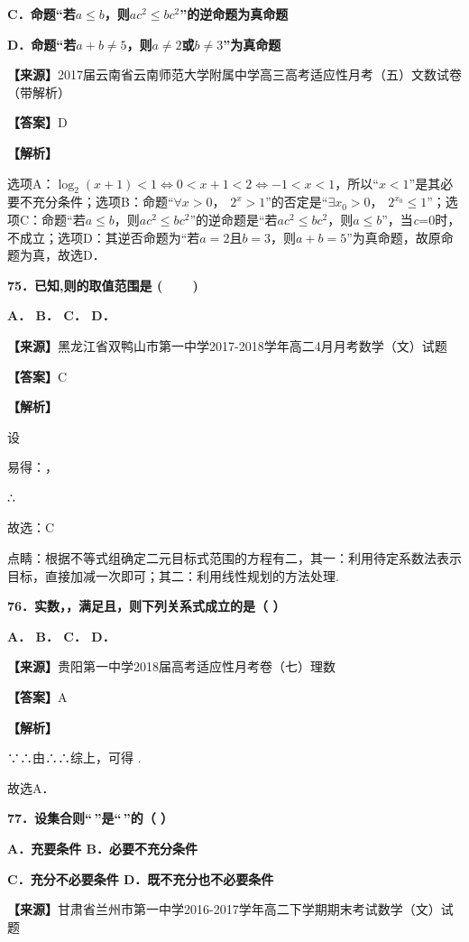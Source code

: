 \documentclass[
]{article}
\begin{document}
\textbf{C．命题``若}\(a \leq b\)\textbf{，则}\(ac^{2} \leq bc^{2}\)\textbf{''的逆命题为真命题}

\textbf{D．命题``若}\(a + b \neq 5\)\textbf{，则}\(a \neq 2\)\textbf{或}\(b \neq 3\)\textbf{''为真命题}

\textbf{【来源】}2017届云南省云南师范大学附属中学高三高考适应性月考（五）文数试卷（带解析）

\textbf{【答案】}D

\textbf{【解析】}

选项A：\(\log_{2}(x + 1) < 1 \Leftrightarrow 0 < x + 1 < 2 \Leftrightarrow - 1 < x < 1\)，所以``\(x < 1\)''是其必要不充分条件；选项B：命题``\(\forall x > 0，\text{  }2^{x} > 1\)''的否定是``\(\exists x_{0} > 0，\text{  }2^{x_{0}} \leq 1\)''；选项C：命题``若\(a \leq b\)，则\(ac^{2} \leq bc^{2}\)''的逆命题是``若\(ac^{2} \leq bc^{2}\)，则\(a \leq b\)''，当\emph{c}=0时，不成立；选项D：其逆否命题为``若\(a = 2\)且\(b = 3\)，则\(a + b = 5\)''为真命题，故原命题为真，故选D．

\textbf{75．已知,则的取值范围是 (　 　)}

\textbf{A． B． C． D．}

\textbf{【来源】}黑龙江省双鸭山市第一中学2017-2018学年高二4月月考数学（文）试题

\textbf{【答案】}C

\textbf{【解析】}

设

易得：，

∴

故选：C

点睛：根据不等式组确定二元目标式范围的方程有二，其一：利用待定系数法表示目标，直接加减一次即可；其二：利用线性规划的方法处理.

\textbf{76．实数，，满足且，则下列关系式成立的是（ ）}

\textbf{A． B． C． D．}

\textbf{【来源】}贵阳第一中学2018届高考适应性月考卷（七）理数

\textbf{【答案】}A

\textbf{【解析】}

∵∴由∴∴综上，可得 .

故选A．

\textbf{77．设集合则``\,''是``\,''的（ ）}

\textbf{A．充要条件 B．必要不充分条件}

\textbf{C．充分不必要条件 D．既不充分也不必要条件}

\textbf{【来源】}甘肃省兰州市第一中学2016-2017学年高二下学期期末考试数学（文）试题
\end{document}
